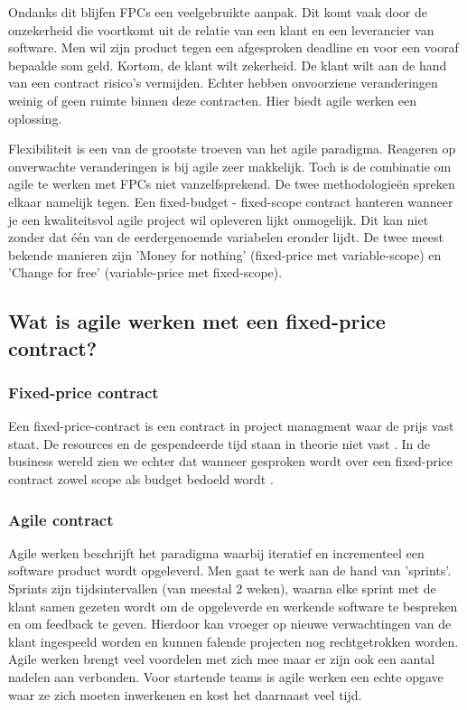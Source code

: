 \documentclass{hogent-article}
\begin{document}
    Ondanks dit blijfen FPCs een veelgebruikte aanpak. Dit komt vaak door de onzekerheid die voortkomt uit de relatie van een klant en een leverancier van software. Men wil zijn product tegen een afgesproken deadline en voor een vooraf bepaalde som geld. Kortom, de klant wilt zekerheid. De klant wilt aan de hand van een contract risico's vermijden. Echter hebben onvoorziene veranderingen 
    weinig of geen ruimte binnen deze contracten. Hier biedt agile werken een oplossing.
    
    Flexibiliteit is een van de grootste troeven van het agile paradigma. Reageren op onverwachte veranderingen is bij agile zeer makkelijk. Toch is de combinatie om agile te werken met FPCs niet vanzelfsprekend. De twee methodologieën spreken elkaar namelijk tegen. Een fixed-budget - fixed-scope contract hanteren wanneer je een kwaliteitsvol agile project wil opleveren lijkt onmogelijk. Dit kan niet zonder dat één van de eerdergenoemde variabelen eronder lijdt. De twee meest bekende manieren zijn 'Money for nothing' (fixed-price met variable-scope) en 'Change for free' (variable-price met fixed-scope). 
	
    \subsection{Wat is agile werken met een fixed-price contract?}
    \subsubsection{Fixed-price contract}
     Een fixed-price-contract is een contract in project managment waar de prijs vast staat. De resources en de gespendeerde tijd staan in theorie niet vast \autocite{PMK}. In de business wereld zien we echter dat wanneer gesproken wordt over een fixed-price contract zowel scope als budget bedoeld wordt \autocite{PMI2011}.
     \subsubsection{Agile contract}
     Agile werken beschrijft het paradigma waarbij iteratief en incrementeel een software product wordt opgeleverd. Men gaat te werk aan de hand van 'sprints'. Sprints zijn tijdsintervallen (van meestal 2 weken), waarna elke sprint met de klant samen gezeten wordt om de opgeleverde en werkende software te bespreken en om feedback te geven. Hierdoor kan vroeger op nieuwe verwachtingen van de klant ingespeeld worden en kunnen falende projecten nog rechtgetrokken worden. Agile werken brengt veel voordelen met zich mee maar er zijn ook een aantal nadelen aan verbonden. Voor startende teams is agile werken een echte opgave waar ze zich moeten inwerkenen en kost het daarnaast veel tijd.
    
\end{document}
